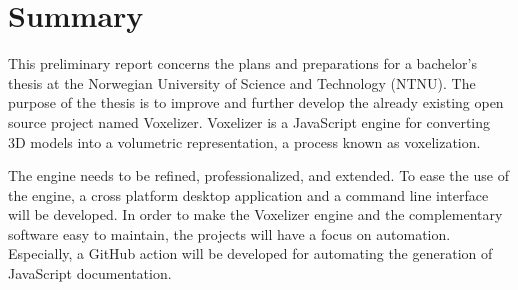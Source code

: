 \section*{Summary}

This preliminary report concerns the plans and preparations for a bachelor's thesis at the Norwegian University of Science and Technology (NTNU). The purpose of the thesis is to improve and further develop the already existing open source project named Voxelizer. Voxelizer is a JavaScript engine for converting 3D models into a volumetric representation, a process known as voxelization.

The engine needs to be refined, professionalized, and extended. To ease the use of the engine, a cross platform desktop application and a command line interface will be developed. In order to make the Voxelizer engine and the complementary software easy to maintain, the projects will have a focus on automation. Especially, a GitHub action will be developed for automating the generation of JavaScript documentation.


